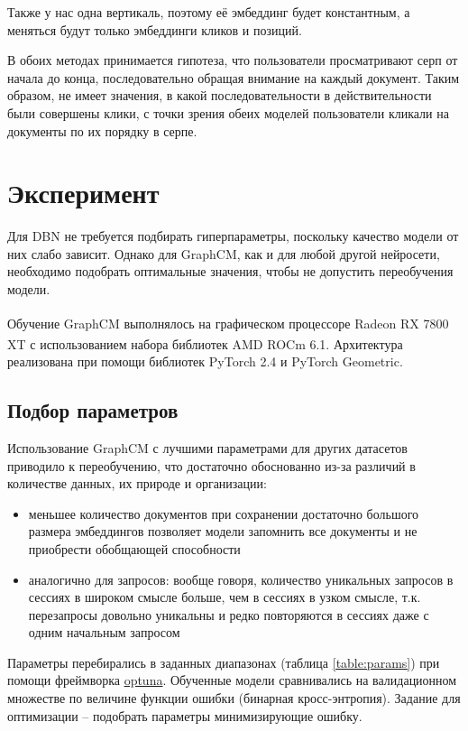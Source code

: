 \documentclass[diploma]{nanolab2015}
\begin{document}
Также у нас одна вертикаль, поэтому её эмбеддинг будет константным, а меняться будут только эмбеддинги кликов и позиций.

\bigbreak

В обоих методах принимается гипотеза, что пользователи просматривают серп от начала до конца, последовательно обращая внимание на каждый документ. Таким образом, не имеет значения, в какой последовательности в действительности были совершены клики, с точки зрения обеих моделей пользователи кликали на документы по их порядку в серпе.
\section{Эксперимент}
Для DBN не требуется подбирать гиперпараметры, поскольку качество модели от них слабо зависит. Однако для GraphCM, как и для любой другой нейросети, необходимо подобрать оптимальные значения, чтобы не допустить переобучения модели.

Обучение GraphCM выполнялось на графическом процессоре Radeon\textsuperscript{\texttrademark} RX 7800 XT с использованием набора библиотек AMD ROCm\textsuperscript{\texttrademark} 6.1. Архитектура реализована при помощи библиотек PyTorch 2.4 и PyTorch Geometric.
\subsection{Подбор параметров}
Использование GraphCM с лучшими параметрами для других датасетов приводило к переобучению, что достаточно обоснованно из-за различий в количестве данных, их природе и организации:
\begin{itemize}
    \item меньшее количество документов при сохранении достаточно большого размера эмбеддингов позволяет модели запомнить все документы и не приобрести обобщающей способности
    \item аналогично для запросов: вообще говоря, количество уникальных запросов в сессиях в широком смысле больше, чем в сессиях в узком смысле, т.к. перезапросы довольно уникальны и редко повторяются в сессиях даже с одним начальным запросом
\end{itemize}

Параметры перебирались в заданных диапазонах (таблица \ref{table:params}) при помощи фреймворка \href{https://optuna.org/}{optuna}. Обученные модели сравнивались на валидационном множестве по величине функции ошибки (бинарная кросс-энтропия). Задание для оптимизации -- подобрать параметры минимизирующие ошибку.
\end{document}
